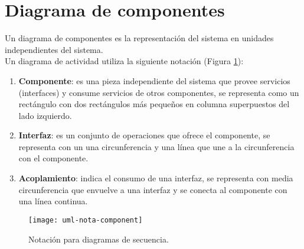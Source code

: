 \section{Diagrama de componentes}\label{sec:uml-comp}
Un diagrama de componentes es la representación del sistema en unidades independientes del sistema\cite{UMLClassroom, SoftwareEngineeringUML}.\\
Un diagrama de actividad utiliza la siguiente notación\cite{UMLClassroom, SoftwareEngineeringUML} (Figura \ref{fig:uml-nota-component}):
\begin{enumerate}
  \item \textbf{Componente}: es una pieza independiente del sistema que provee servicios (interfaces) y consume servicios de otros componentes, se representa como un rectángulo con dos rectángulos más pequeños en columna superpuestos del lado izquierdo.
  \item \textbf{Interfaz}: es un conjunto de operaciones que ofrece el componente, se representa con un una circunferencia y una línea que une a la circunferencia con el componente.
  \item \textbf{Acoplamiento}: indica el consumo de una interfaz, se representa con media circunferencia que envuelve a una interfaz y se conecta al componente con una línea continua.
\end{enumerate}

\begin{figure}[h]
  \centering
  \texttt{[image: uml-nota-component]}
  \caption{Notación para diagramas de secuencia\cite{SoftwareEngineeringUML}.}
  \label{fig:uml-nota-component}
\end{figure}

